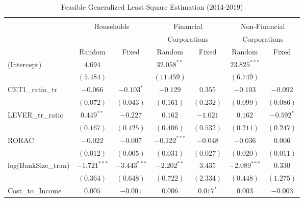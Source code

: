 
\begin{table}
\caption{Feasible Generalized Least Square Estimation (2014-2019)}
\begin{center}
\begin{tabular}{l c c c c c c}
\\[-1.8ex]\hline 
\hline \\[-1.8ex] 
\multicolumn{0}{c}{} & \multicolumn{2}{c}{Households } & \multicolumn{2}{c}{Financial} &  \multicolumn{2}{c}{Non-Financial}\\ 
\multicolumn{0}{c}{} & \multicolumn{2}{c}{} & \multicolumn{2}{c}{Corporations}& \multicolumn{2}{c}{Corporations} \\ 
\hline
\hline
 & {\small Random} &  {\small Fixed } & {\small Random } &  {\small Fixed }& {\small Random } &  {\small Fixed } \\
\hline
(Intercept)         & $4.694$        &                & $32.058^{**}$  &              & $23.825^{***}$ &               \\
                    & $(5.484)$      &                & $(11.459)$     &              & $(6.749)$      &               \\
CET1\_ratio\_tr     & $-0.066$       & $-0.103^{*}$   & $-0.129$       & $0.355$      & $-0.103$       & $-0.092$      \\
                    & $(0.072)$      & $(0.043)$      & $(0.161)$      & $(0.232)$    & $(0.099)$      & $(0.086)$     \\
LEVER\_tr\_ratio    & $0.449^{**}$   & $-0.227$       & $0.162$        & $-1.021$     & $0.162$        & $-0.592^{*}$  \\
                    & $(0.167)$      & $(0.125)$      & $(0.406)$      & $(0.532)$    & $(0.211)$      & $(0.247)$     \\
RORAC               & $-0.022$       & $-0.007$       & $-0.122^{***}$ & $-0.048$     & $-0.036$       & $0.006$       \\
                    & $(0.012)$      & $(0.005)$      & $(0.031)$      & $(0.027)$    & $(0.020)$      & $(0.011)$     \\
log(BankSize\_tran) & $-1.721^{***}$ & $-3.443^{***}$ & $-2.202^{**}$  & $3.435$      & $-2.089^{***}$ & $0.330$       \\
                    & $(0.364)$      & $(0.648)$      & $(0.722)$      & $(2.334)$    & $(0.448)$      & $(1.275)$     \\
Cost\_to\_Income    & $0.005$        & $-0.001$       & $0.006$        & $0.017^{*}$  & $0.003$        & $-0.003$      \\

\end{tabular}
\end{center}
\end{table}
